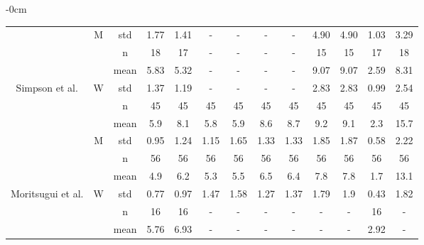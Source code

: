 \documentclass[journal,article,submit,pdftex,moreauthors]{Definitions/mdpi}
\begin{document}
\begin{table}[H]
\begin{adjustwidth}{-\extralength}{0cm}
{\begin{tabular}{ccccccccccccc}
 & \multirow{-3}{*}{M} & std & 1.77 & 1.41 & - & - & - & - & 4.90 & 4.90 & 1.03 & 3.29 \\ \cline{2-13} 
 &  & n & 18 & 17 & - & - & - & - & 15 & 15 & 17 & 18 \\ \cline{3-13} 
 &  & {\color[HTML]{FE0000} mean} & {\color[HTML]{FE0000} 5.83} & {\color[HTML]{FE0000} 5.32} & {\color[HTML]{FE0000} -} & {\color[HTML]{FE0000} -} & {\color[HTML]{FE0000} -} & {\color[HTML]{FE0000} -} & {\color[HTML]{FE0000} 9.07} & {\color[HTML]{FE0000} 9.07} & {\color[HTML]{FE0000} 2.59} & {\color[HTML]{FE0000} 8.31} \\ \cline{3-13} 
\multirow{-6}{*}{Simpson et al.} & \multirow{-3}{*}{W} & std & 1.37 & 1.19 & - & - & - & - & 2.83 & 2.83 & 0.99 & 2.54 \\ \hline
 &  & n & 45 & 45 & 45 & 45 & 45 & 45 & 45 & 45 & 45 & 45 \\ \cline{3-13} 
 &  & {\color[HTML]{3531FF} mean} & {\color[HTML]{3531FF} 5.9} & {\color[HTML]{3531FF} 8.1} & {\color[HTML]{3531FF} 5.8} & {\color[HTML]{3531FF} 5.9} & {\color[HTML]{3531FF} 8.6} & {\color[HTML]{3531FF} 8.7} & {\color[HTML]{3531FF} 9.2} & {\color[HTML]{3531FF} 9.1} & {\color[HTML]{3531FF} 2.3} & {\color[HTML]{3531FF} 15.7} \\ \cline{3-13} 
 & \multirow{-3}{*}{M} & std & 0.95 & 1.24 & 1.15 & 1.65 & 1.33 & 1.33 & 1.85 & 1.87 & 0.58 & 2.22 \\ \cline{2-13} 
 &  & n & 56 & 56 & 56 & 56 & 56 & 56 & 56 & 56 & 56 & 56 \\ \cline{3-13} 
 &  & {\color[HTML]{FE0000} mean} & {\color[HTML]{FE0000} 4.9} & {\color[HTML]{FE0000} 6.2} & {\color[HTML]{FE0000} 5.3} & {\color[HTML]{FE0000} 5.5} & {\color[HTML]{FE0000} 6.5} & {\color[HTML]{FE0000} 6.4} & {\color[HTML]{FE0000} 7.8} & {\color[HTML]{FE0000} 7.8} & {\color[HTML]{FE0000} 1.7} & {\color[HTML]{FE0000} 13.1} \\ \cline{3-13} 
\multirow{-6}{*}{Moritsugui et al.} & \multirow{-3}{*}{W} & std & 0.77 & 0.97 & 1.47 & 1.58 & 1.27 & 1.37 & 1.79 & 1.9 & 0.43 & 1.82 \\ \hline
 &  & n & 16 & 16 & - & - & - & - & - & - & 16 & - \\ \cline{3-13} 
 &  & {\color[HTML]{3531FF} mean} & {\color[HTML]{3531FF} 5.76} & {\color[HTML]{3531FF} 6.93} & {\color[HTML]{3531FF} -} & {\color[HTML]{3531FF} -} & {\color[HTML]{3531FF} -} & {\color[HTML]{3531FF} -} & {\color[HTML]{3531FF} -} & {\color[HTML]{3531FF} -} & {\color[HTML]{3531FF} 2.92} & {\color[HTML]{3531FF} -} \\ \cline{3-13} 

\end{tabular}}
\end{adjustwidth}
\end{table}
\end{document}
